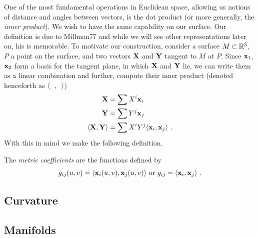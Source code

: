 \begin{unno_rem}
  One of the most fundamental operations in Euclidean space, allowing us notions of distance and angles between vectors, is the dot product (or more generally, the \emph{inner product}). We wish to have the same capability on our surface. Our definition is due to Millman77 and while we will see other representations later on, his is memorable. To motivate our construction, consider a surface $M \subset \mathbb{R}^3$, $P$ a point on the surface, and two vectors $\mathbf{X}$ and $\mathbf{Y}$ tangent to $M$ at $P$. Since $\mathbf{x}_1$, $\mathbf{x}_2$ form a basis for the tangent plane, in which $\mathbf{X}$ and $\mathbf{Y}$ lie, we can write them as a linear combination and further, compute their inner product (denoted henceforth as $\langle\phantom{x},\phantom{x}\rangle$)
  \begin{align*}
    \mathbf{X} &= \sum X^i\mathbf{x}_i\\
    \mathbf{Y} &= \sum Y^j\mathbf{x}_j\\
    \langle\mathbf{X}, \mathbf{Y}\rangle &= \sum X^iY^j\langle\mathbf{x}_i, \mathbf{x}_j\rangle \ .
  \end{align*}
  With this in mind we make the following definition.
\end{unno_rem}

\begin{defn}
  The \emph{metric coefficients} are the functions defined by
  \[
    g_{ij}(u, v) = \langle\mathbf{x}_i(u, v), \mathbf{x}_j(u, v)\rangle \text{ or } g_{ij} = \langle\mathbf{x}_i, \mathbf{x}_j\rangle \ .
  \]
\end{defn}




\subsection{Curvature}





\subsection{Manifolds}